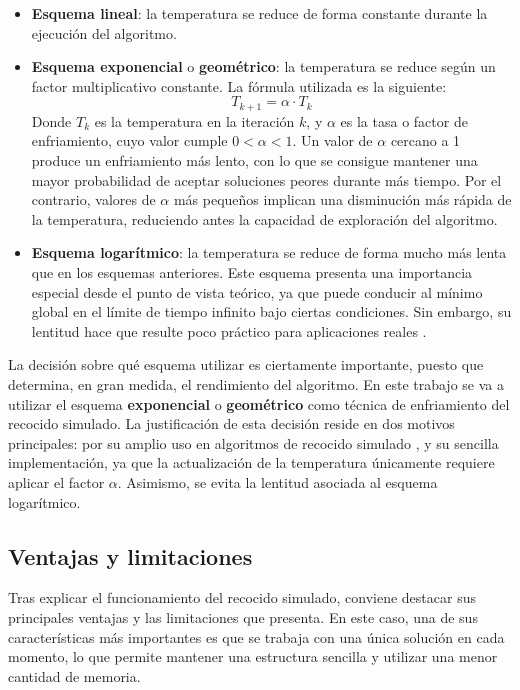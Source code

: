 \begin{itemize}
  \item \textbf{Esquema lineal}: la temperatura se reduce de forma constante durante la ejecución del algoritmo.
  \item \textbf{Esquema exponencial} o \textbf{geométrico}: la temperatura se reduce según un factor multiplicativo constante.
  La fórmula utilizada es la siguiente:
  \begin{equation}
    T_{k+1} = \alpha \cdot T_k
  \end{equation}
  Donde $T_k$ es la temperatura en la iteración $k$, y $\alpha$ es la tasa o factor de enfriamiento, cuyo valor cumple 
  $0 < \alpha < 1$. Un valor de $\alpha$ cercano a 1 produce un enfriamiento más lento, con lo que se  consigue mantener una
  mayor probabilidad de aceptar soluciones peores durante más tiempo. Por el contrario, valores de $\alpha$ más pequeños 
  implican una disminución más rápida de la temperatura, reduciendo antes la capacidad de exploración del algoritmo.
  \item \textbf{Esquema logarítmico}: la temperatura se reduce de forma mucho más lenta que en los esquemas anteriores. Este
  esquema presenta una importancia especial desde el punto de vista teórico, ya que puede conducir al mínimo global en el 
  límite de tiempo infinito bajo ciertas condiciones. Sin embargo, su lentitud hace que resulte poco práctico para aplicaciones
  reales \cite{nourani1998}.
\end{itemize}

La decisión sobre qué esquema utilizar es ciertamente importante, puesto que determina, en gran medida, el rendimiento del 
algoritmo. En este trabajo se va a utilizar el esquema \textbf{exponencial} o \textbf{geométrico} como técnica de enfriamiento
del recocido simulado. La justificación de esta decisión reside en dos motivos principales: por su amplio uso en algoritmos
de recocido simulado \cite{nourani1998}, y su sencilla implementación, ya que la actualización de la temperatura únicamente 
requiere aplicar el factor $\alpha$. Asimismo, se evita la lentitud asociada al esquema logarítmico.

\subsection{Ventajas y limitaciones}
\label{subsec:sa_proscons}

Tras explicar el funcionamiento del recocido simulado, conviene destacar sus principales ventajas y las limitaciones que
presenta. En este caso, una de sus características más importantes es que se trabaja con una única solución en cada momento,
lo que permite mantener una estructura sencilla y utilizar una menor cantidad de memoria.

